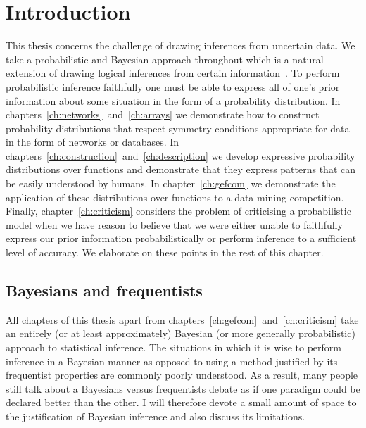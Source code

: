 
\inbpdocument

\chapter{Introduction}
\label{ch:intro}


This thesis concerns the challenge of drawing inferences from uncertain data.
We take a probabilistic and Bayesian approach throughout  which is a natural extension of drawing logical inferences from certain information~\citep[e.g.][]{Jaynes2003-jh}.
To perform probabilistic inference faithfully one must be able to express all of one's prior information about some situation in the form of a probability distribution.
In chapters~\ref{ch:networks}~and~\ref{ch:arrays} we demonstrate how to construct probability distributions that respect symmetry conditions appropriate for data in the form of networks or databases.
In chapters~\ref{ch:construction}~and~\ref{ch:description} we develop expressive probability distributions over functions and demonstrate that they express patterns that can be easily understood by humans.
In chapter~\ref{ch:gefcom} we demonstrate the application of these distributions over functions to a data mining competition.
Finally, chapter~\ref{ch:criticism} considers the problem of criticising a probabilistic model when we have reason to believe that we were either unable to faithfully express our prior information probabilistically or perform inference to a sufficient level of accuracy.
We elaborate on these points in the rest of this chapter.

\section{Bayesians and frequentists}

All chapters of this thesis apart from chapters~\ref{ch:gefcom}~and~\ref{ch:criticism} take an entirely (or at least approximately) Bayesian (or more generally probabilistic) approach to statistical inference.
The situations in which it is wise to perform inference in a Bayesian manner as opposed to using a method justified by its frequentist properties are commonly poorly understood.
As a result, many people still talk about a Bayesians versus frequentists debate as if one paradigm could be declared better than the other\footnotemark{}.
I will therefore devote a small amount of space to the justification of Bayesian inference and also discuss its limitations.

